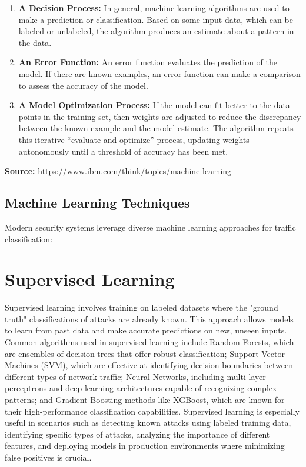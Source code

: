 \documentclass{report}
\begin{document}
\begin{enumerate}
    \item \textbf{A Decision Process:} In general, machine learning algorithms are used to make a prediction or classification. Based on some input data, which can be labeled or unlabeled, the algorithm produces an estimate about a pattern in the data.
    
    \item \textbf{An Error Function:} An error function evaluates the prediction of the model. If there are known examples, an error function can make a comparison to assess the accuracy of the model.
    
    \item \textbf{A Model Optimization Process:} If the model can fit better to the data points in the training set, then weights are adjusted to reduce the discrepancy between the known example and the model estimate. The algorithm repeats this iterative ``evaluate and optimize'' process, updating weights autonomously until a threshold of accuracy has been met.
\end{enumerate}

\noindent\textbf{Source:} \href{https://www.ibm.com/think/topics/machine-learning}{https://www.ibm.com/think/topics/machine-learning}

\subsection{Machine Learning Techniques}

Modern security systems leverage diverse machine learning approaches for traffic classification:


\section*{Supervised Learning}

Supervised learning involves training on labeled datasets where the "ground truth" classifications of attacks are already known. This approach allows models to learn from past data and make accurate predictions on new, unseen inputs. Common algorithms used in supervised learning include Random Forests, which are ensembles of decision trees that offer robust classification; Support Vector Machines (SVM), which are effective at identifying decision boundaries between different types of network traffic; Neural Networks, including multi-layer perceptrons and deep learning architectures capable of recognizing complex patterns; and Gradient Boosting methods like XGBoost, which are known for their high-performance classification capabilities. Supervised learning is especially useful in scenarios such as detecting known attacks using labeled training data, identifying specific types of attacks, analyzing the importance of different features, and deploying models in production environments where minimizing false positives is crucial.
\end{document}
